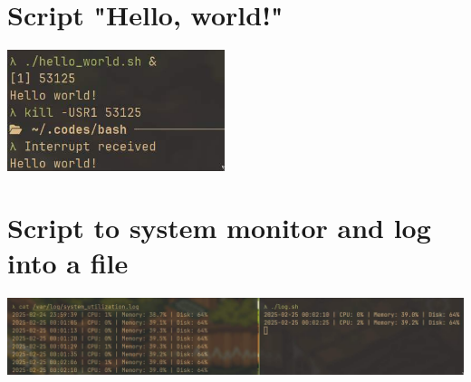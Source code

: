 \documentclass{article}
\begin{document}
\section{Script "Hello, world!"}
\noindent

\includegraphics[width=180pt]{5_5.jpg}

\section{Script to system monitor and log into a file}
\noindent

\includegraphics[width=460pt]{5_6.jpg}
\end{document}
